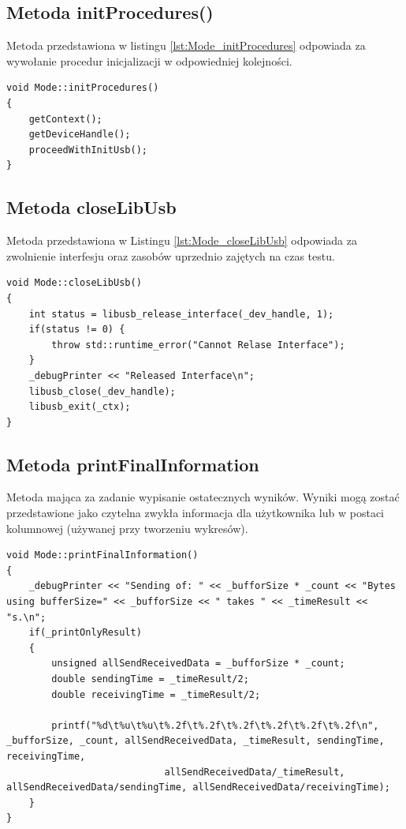 \documentclass{BscUS}
\begin{document}
\subsection{Metoda initProcedures()}
Metoda przedstawiona w listingu \ref{lst:Mode_initProcedures} odpowiada za wywołanie procedur inicjalizacji w odpowiedniej kolejności.
\begin{lstlisting}[caption={Metoda Mode::initProcedures()},label={lst:Mode_initProcedures}]
void Mode::initProcedures()
{
	getContext(); 
	getDeviceHandle();
	proceedWithInitUsb();
}
\end{lstlisting}
\subsection{Metoda closeLibUsb}
Metoda przedstawiona w Listingu \ref{lst:Mode_closeLibUsb} odpowiada za zwolnienie interfesju oraz zasobów uprzednio zajętych na czas testu.
\begin{lstlisting}[caption={Metoda Mode::closeLibUsb()},label={lst:Mode_closeLibUsb}]
void Mode::closeLibUsb()
{
	int status = libusb_release_interface(_dev_handle, 1); 
	if(status != 0) {
		throw std::runtime_error("Cannot Relase Interface");
	}
	_debugPrinter << "Released Interface\n";
	libusb_close(_dev_handle);
	libusb_exit(_ctx); 
}
\end{lstlisting}


\subsection{Metoda printFinalInformation}
Metoda mająca za zadanie wypisanie ostatecznych wyników. Wyniki mogą zostać przedstawione jako czytelna zwykła informacja dla użytkownika lub w postaci kolumnowej (używanej przy tworzeniu wykresów).
\begin{lstlisting}[caption={Metoda Mode::printFinalInformation()},label={lst:Mode_printFinalInformation}]
void Mode::printFinalInformation()
{
	_debugPrinter << "Sending of: " << _bufforSize * _count << "Bytes using bufferSize=" << _bufforSize << " takes " << _timeResult << "s.\n";
	if(_printOnlyResult)
	{
		unsigned allSendReceivedData = _bufforSize * _count;
		double sendingTime = _timeResult/2;
		double receivingTime = _timeResult/2;

		printf("%d\t%u\t%u\t%.2f\t%.2f\t%.2f\t%.2f\t%.2f\t%.2f\n", _bufforSize, _count, allSendReceivedData, _timeResult, sendingTime, receivingTime,
							allSendReceivedData/_timeResult, allSendReceivedData/sendingTime, allSendReceivedData/receivingTime);
	}
}
\end{lstlisting}
\end{document}
